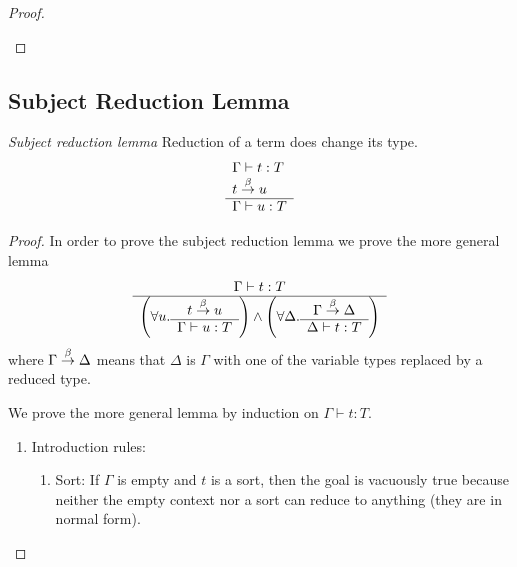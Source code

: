\begin{theorem}
\begin{proof}
\begin{enumerate}
        \end{enumerate}
    \end{proof}
\end{theorem}






\subsection{Subject Reduction Lemma}

\begin{theorem}
    \label{SubjectReduction}
    \emph{Subject reduction lemma} Reduction of a term does change its type.
    $$
    \begin{array}{l} 
        \Gamma \vdash t: T
        \\
        t \stackrel{\beta}{\to} u
     \\ \hline 
        \Gamma \vdash u: T
    \end{array}
    $$

    {
    \def\SRLeftPart#1#2#3#4{
        \left(
        \forall #1.
        \ruleh{#2 \reduce #1}{#3 \vdash #1: #4}
        \right)
    }
    \def\SRRightPart#1#2#3#4{
        \left(
        \forall #1.
        \ruleh{#2 \reduce #1}{#1 \vdash #3: #4}
        \right)
    }

    \begin{proof} In order to prove the subject reduction lemma we prove the
        more general lemma
        $$
        \ruleh{
            \Gamma \vdash t: T
        }
        {
            \SRLeftPart u t \Gamma T
            \land
            \SRRightPart \Delta \Gamma t T
        }
        $$
        where $\Gamma \stackrel{\beta}{\to} \Delta$ means that $\Delta$ is $\Gamma$ with one
        of the variable types replaced by a reduced type.

        We prove the more general lemma by induction on $\Gamma \vdash t: T$.
        \begin{enumerate}
            \item Introduction rules:
            \begin{enumerate}
                \item Sort: If $\Gamma$ is empty and $t$ is a sort, then the
                    goal is vacuously true because neither the empty context nor
                    a sort can reduce to anything (they are in normal form).


\end{enumerate}
\end{enumerate}
\end{proof}}
\end{theorem}
